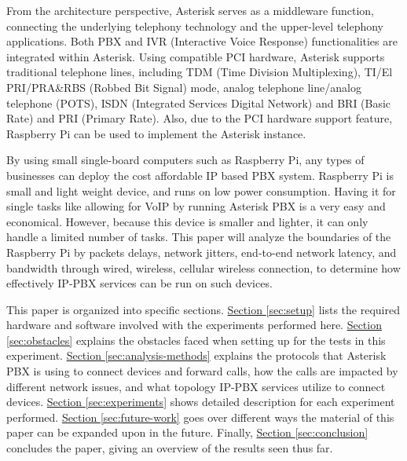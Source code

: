 From the architecture perspective, Asterisk serves as a middleware function, connecting the underlying telephony technology and the upper-level telephony applications. Both PBX and IVR (Interactive Voice Response) functionalities are integrated within Asterisk. Using compatible PCI hardware, Asterisk supports traditional telephone lines, including TDM (Time Division Multiplexing), TI/El PRI/PRA\&RBS (Robbed Bit Signal) mode, analog telephone line/analog telephone (POTS), ISDN (Integrated Services Digital Network) and BRI (Basic Rate) and PRI (Primary Rate). Also, due to the PCI hardware support feature, Raspberry Pi can be used to implement the Asterisk instance. 

By using small single-board computers such as Raspberry Pi, any types of businesses can deploy the cost affordable IP based PBX system. Raspberry Pi is small and light weight device, and runs on low power consumption. Having it for single tasks like allowing for VoIP by running Asterisk PBX is a very easy and economical. However, because this device is smaller and lighter, it can only handle a limited number of tasks. This paper will analyze the boundaries of the Raspberry Pi by packets delays, network jitters, end-to-end network latency, and bandwidth through wired, wireless, cellular wireless connection, to determine how effectively IP-PBX services can be run on such devices.
	
This paper is organized into specific sections. \hyperref[sec:setup]{Section \ref{sec:setup}} lists the required hardware and software involved with the experiments performed here.  \hyperref[sec:obstacles]{Section \ref{sec:obstacles}} explains the obstacles faced when setting up for the tests in this experiment. \hyperref[sec:analysis-methods]{Section \ref{sec:analysis-methods}} explains the protocols that Asterisk PBX is using to connect devices and forward calls, how the calls are impacted by different network issues, and what topology IP-PBX services utilize to connect devices. \hyperref[sec:experiments]{Section \ref{sec:experiments}} shows detailed description for each experiment performed. \hyperref[sec:future-work]{Section \ref{sec:future-work}} goes over different ways the material of this paper can be expanded upon in the future. Finally, \hyperref[sec:conclusion]{Section \ref{sec:conclusion}} concludes the paper, giving an overview of the results seen thus far.
